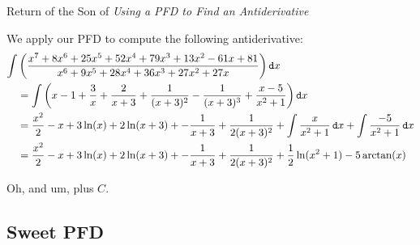 \begin{example}{Return of the Son of \emph{Using a PFD to Find an Antiderivative}}

We apply our PFD to compute the following antiderivative:
\begin{align*}
 \int  &\left(\frac{x^7+8 x^6+25 x^5+52 x^4+79 x^3+13 x^2-61 x+81}{x^6+9 x^5+28 x^4+36 x^3+27 x^2+27 x}\right) \mathop{}\!\mathtt{d} x \\
&=\int \left(x-1 + \frac{3}{x} + \frac{2}{x + 3} + \frac{1}{(x + 3)^2} - \frac{1}{(x + 3)^3} + \frac{x - 5}{x^2 + 1}\right) \mathop{}\!\mathtt{d} x\\
&=\frac{x^2}{2}-x+3\ln(x)  +2\ln(x+3) + -\frac{1}{x+3}   + \frac{1}{2(x + 3)^2} +\int \frac{x}{x^2 + 1} \mathop{}\!\mathtt{d} x+ \int \frac{-5}{x^2 + 1} \mathop{}\!\mathtt{d} x\\
&=\frac{x^2}{2}-x+3\ln(x)  +2\ln(x+3) + -\frac{1}{x+3}   + \frac{1}{2(x + 3)^2}  + \frac{1}{2}\ln(x^2+1) -5 \arctan(x)
\end{align*}

Oh, and um, plus $C$.
\end{example}

\subsection{Sweet PFD }

 

